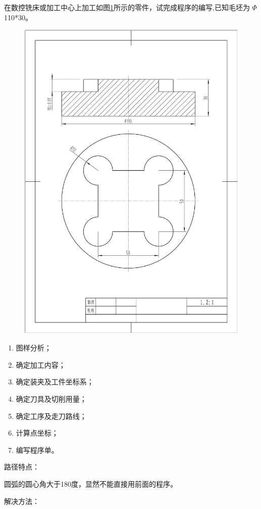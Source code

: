 在数控铣床或加工中心上加工如图\ref{fig:4-1}所示的零件，试完成程序的编写,已知毛坯为 $\Phi$ 110*30。

\begin{figure}[h]
    \centering
    \includegraphics[width=0.8\linewidth,trim=50 150 50 100,clip]{data/image/5-2.jpg}
    \caption{}
    \label{fig:4-1}
\end{figure}

\begin{enumerate}[1、]
    \item 图样分析；
    \item 确定加工内容；
    \item 确定装夹及工件坐标系；
    \item 确定刀具及切削用量；
    \item 确定工序及走刀路线；
    \item 计算点坐标；
    \item 编写程序单。
\end{enumerate}


路径特点：

圆弧的圆心角大于180度，显然不能直接用前面的程序。

解决方法：




